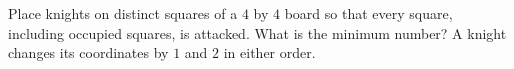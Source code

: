 Place knights on distinct squares of a $4$ by $4$ board so that every square, including occupied squares, is attacked. What is the minimum number? A knight changes its coordinates by $1$ and $2$ in either order.
